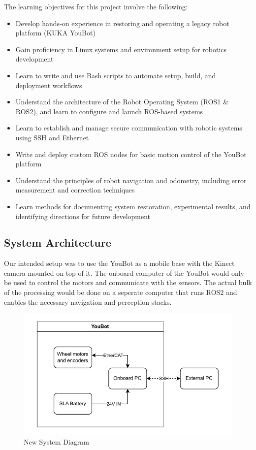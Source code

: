\documentclass[a4paper, 12pt]{article}
\begin{document}
    The learning objectives for this project involve the following:
    \begin{itemize}[noitemsep, topsep=0pt]
        \item Develop hands-on experience in restoring and operating a legacy robot platform (KUKA YouBot)
        \item Gain proficiency in Linux systems and environment setup for robotics development
        \item Learn to write and use Bash scripts to automate setup, build, and deployment workflows
        \item Understand the architecture of the Robot Operating System (ROS1 \& ROS2), and learn to configure and launch ROS-based systems
        \item Learn to establish and manage secure communication with robotic systems using SSH and Ethernet
        \item Write and deploy custom ROS nodes for basic motion control of the YouBot platform
        \item Understand the principles of robot navigation and odometry, including error measurement and correction techniques
        \item Learn methods for documenting system restoration, experimental results, and identifying directions for future development
    \end{itemize}

    \subsection{System Architecture}
    Our intended setup was to use the YouBot as a mobile base with the Kinect camera mounted on top of it. The onboard computer of the YouBot would only be used to control the motors and communicate with the sensors. The actual bulk of the processing would be done on a seperate computer that runs ROS2 and enables the necessary navigation and perception stacks.
    
    \begin{figure}[H]
        \centering
        \includegraphics[width=\linewidth]{diagrams/new_arch.drawio.pdf}
        \caption{New System Diagram}
        \label{fig:new-system-diagram}
    \end{figure}
\end{document}
